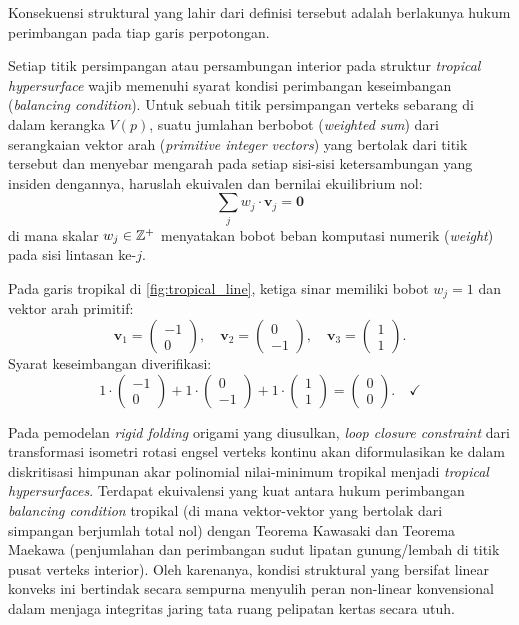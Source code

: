 Konsekuensi struktural yang lahir dari definisi tersebut adalah berlakunya hukum perimbangan pada tiap garis perpotongan.
\begin{teorema}
  Setiap titik persimpangan atau persambungan interior pada struktur \textit{tropical hypersurface} wajib memenuhi syarat kondisi perimbangan keseimbangan (\textit{balancing condition}). Untuk sebuah titik persimpangan verteks sebarang di dalam kerangka $V(p)$, suatu jumlahan berbobot (\textit{weighted sum}) dari serangkaian vektor arah (\textit{primitive integer vectors}) yang bertolak dari titik tersebut dan menyebar mengarah pada setiap sisi-sisi ketersambungan yang insiden dengannya, haruslah ekuivalen dan bernilai ekuilibrium nol:
  \[
    \sum_{j} w_j \cdot \mathbf{v}_j = \mathbf{0}
  \]
  di mana skalar $w_j \in \mathbb{Z}^+$ menyatakan bobot beban komputasi numerik (\textit{weight}) pada sisi lintasan ke-$j$.
\end{teorema}

\begin{contoh}
  Pada garis tropikal di \ref{fig:tropical_line}, ketiga sinar memiliki bobot $w_j = 1$ dan vektor arah primitif:
  \[
    \mathbf{v}_1 = \begin{pmatrix} -1 \\ 0 \end{pmatrix}, \quad \mathbf{v}_2 = \begin{pmatrix} 0 \\ -1 \end{pmatrix}, \quad \mathbf{v}_3 = \begin{pmatrix} 1 \\ 1 \end{pmatrix}.
  \]
  Syarat keseimbangan diverifikasi:
  \[
    1 \cdot \begin{pmatrix} -1 \\ 0 \end{pmatrix} + 1 \cdot \begin{pmatrix} 0 \\ -1 \end{pmatrix} + 1 \cdot \begin{pmatrix} 1 \\ 1 \end{pmatrix} = \begin{pmatrix} 0 \\ 0 \end{pmatrix}. \quad \checkmark
  \]
\end{contoh}

Pada pemodelan \textit{rigid folding} origami yang diusulkan, \textit{loop closure constraint} dari transformasi isometri rotasi engsel verteks kontinu akan diformulasikan ke dalam diskritisasi himpunan akar polinomial nilai-minimum tropikal menjadi \textit{tropical hypersurfaces}. Terdapat ekuivalensi yang kuat antara hukum perimbangan \textit{balancing condition} tropikal (di mana vektor-vektor yang bertolak dari simpangan berjumlah total nol) dengan Teorema Kawasaki dan Teorema Maekawa (penjumlahan dan perimbangan sudut lipatan gunung/lembah di titik pusat verteks interior). Oleh karenanya, kondisi struktural yang bersifat linear konveks ini bertindak secara sempurna menyulih peran non-linear konvensional dalam menjaga integritas jaring tata ruang pelipatan kertas secara utuh.

